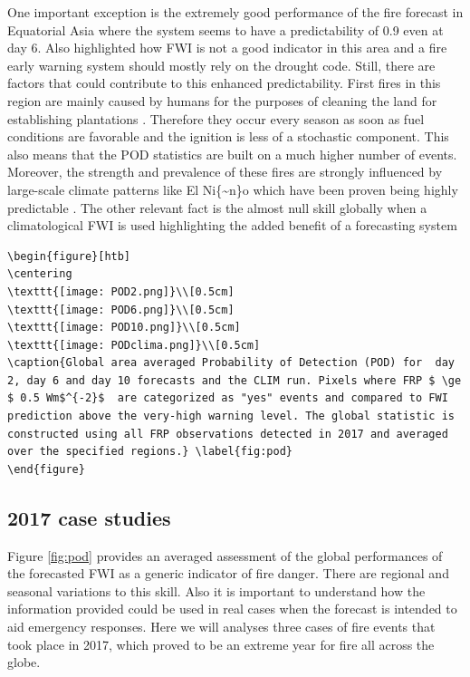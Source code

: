 \documentclass[, manuscript]{copernicus}
\begin{document}
One important exception is the extremely good performance of the fire
forecast in Equatorial Asia where the system seems to have a
predictability of 0.9 even at day 6. Also \citet{degroot:07} highlighted
how FWI is not a good indicator in this area and a fire early warning
system should mostly rely on the drought code. Still, there are factors
that could contribute to this enhanced predictability. First fires in
this region are mainly caused by humans for the purposes of cleaning the
land for establishing plantations \citep{field:09,benedetti:16}.
Therefore they occur every season as soon as fuel conditions are
favorable and the ignition is less of a stochastic component. This also
means that the POD statistics are built on a much higher number of
events. Moreover, the strength and prevalence of these fires are
strongly influenced by large-scale climate patterns like El
Ni\{\textasciitilde{}n\}o \cite{field:04} which have been proven being
highly predictable \citep{zhu:15}. The other relevant fact is the almost
null skill globally when a climatological FWI is used highlighting the
added benefit of a forecasting system

\begin{verbatim}
\begin{figure}[htb]
\centering
\texttt{[image: POD2.png]}\\[0.5cm]
\texttt{[image: POD6.png]}\\[0.5cm]
\texttt{[image: POD10.png]}\\[0.5cm]
\texttt{[image: PODclima.png]}\\[0.5cm]
\caption{Global area averaged Probability of Detection (POD) for  day 2, day 6 and day 10 forecasts and the CLIM run. Pixels where FRP $ \ge $ 0.5 Wm$^{-2}$  are categorized as "yes" events and compared to FWI prediction above the very-high warning level. The global statistic is constructed using all FRP observations detected in 2017 and averaged over the specified regions.} \label{fig:pod}
\end{figure}
\end{verbatim}

\subsection{2017 case studies}

Figure \ref{fig:pod} provides an averaged assessment of the global
performances of the forecasted FWI as a generic indicator of fire
danger. There are regional and seasonal variations to this skill. Also
it is important to understand how the information provided could be used
in real cases when the forecast is intended to aid emergency responses.
Here we will analyses three cases of fire events that took place in
2017, which proved to be an extreme year for fire all across the globe.
\end{document}
